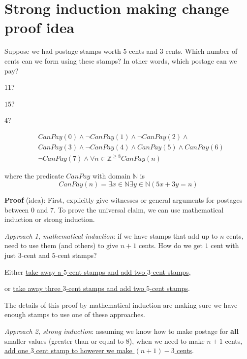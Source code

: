 \documentclass[12pt, oneside]{article}
\begin{document}
\begin{flushright}
\end{flushright} \section*{Strong induction making change proof idea}


Suppose we had postage stamps worth $5$ cents and $3$ cents.
Which number of cents can we form using these stamps?
In other words, which postage can we pay?

$11$? 

$15$? 


$4$?



\begin{align*}
    &CanPay(0) \land \lnot CanPay(1) \land \lnot CanPay(2) \land \\
    &CanPay(3) \land \lnot CanPay(4) \land CanPay(5) \land CanPay(6) \\
    &\lnot CanPay(7) \land \forall n \in \mathbb{Z}^{\geq 8} CanPay(n)
\end{align*}

where the predicate $CanPay$ with domain $\mathbb{N}$ is
\[
    CanPay(n) = \exists x \in \mathbb{N} \exists y \in \mathbb{N}  ( 5x+3y = n)
\]


{\bf Proof} (idea): First, explicitly give witnesses or general arguments
for postages between $0$ and $7$. 
To prove the universal claim, we can use mathematical induction or strong induction.

{\it Approach 1, mathematical induction}: if we have
stamps that add up to $n$ cents, need to use them (and others)
to give $n+1$ cents. How do we get $1$ cent with just $3$-cent
and $5$-cent stamps?

\vspace{-10pt}
Either \underline{take away a $5$-cent stamps and add two $3$-cent stamps},

\vspace{-10pt}
or \underline{take away three $3$-cent stamps and add two $5$-cent stamps}.

\vspace{-10pt}
The details of this proof by mathematical induction
are making sure we have enough 
stamps to use one of these approaches.

{\it Approach 2, strong induction}: assuming we know how to make postage
for {\bf all} smaller values (greater than or equal to $8$), when
we need to make $n+1$ cents, \underline{add one $3$ cent stamp to 
however we make $(n+1) - 3$ cents}.
\end{document}
